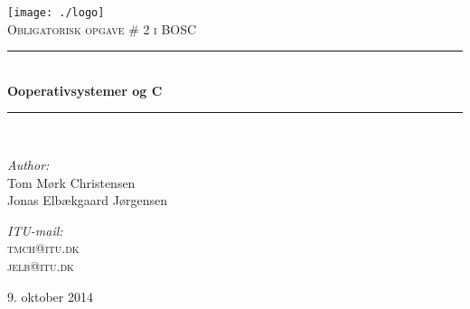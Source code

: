 \begin{titlepage}
\begin{center}


\texttt{[image: ./logo]}\\[1cm]

\textsc{\Large Obligatorisk opgave \# 2 i BOSC}\\[0.5cm]

\rule{\linewidth}{0.5mm} \\[0.3cm]
{ \LARGE \bfseries Ooperativsystemer og C\\[0.3cm]}
\rule{\linewidth}{0.5mm} \\[1.5cm]

\begin{minipage}{0.5\textwidth}
\begin{flushleft} \large
\emph{Author:}\\
Tom Mørk Christensen\\
Jonas Elbækgaard Jørgensen
\end{flushleft}
\end{minipage}
\begin{minipage}{0.3\textwidth}
\begin{flushright} \large
\emph{ITU-mail:} \\
\textsc{tmch@itu.dk} \\
\textsc{jelb@itu.dk}
\end{flushright}
\end{minipage}

\vfill

\large 9. oktober 2014

\end{center}
\end{titlepage}